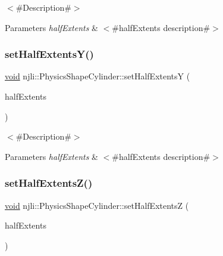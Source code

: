 $<$\#\+Description\#$>$


\begin{DoxyParams}{Parameters}
{\em half\+Extents} & $<$\#half\+Extents description\#$>$ \\
\hline
\end{DoxyParams}
\mbox{\label{classnjli_1_1_physics_shape_cylinder_afac940ffcb588c11962642b4d0329d10}} 
\subsubsection{\texorpdfstring{set\+Half\+Extents\+Y()}{setHalfExtentsY()}}
{\footnotesize\ttfamily \mbox{\hyperlink{_thread_8h_af1e856da2e658414cb2456cb6f7ebc66}{void}} njli\+::\+Physics\+Shape\+Cylinder\+::set\+Half\+ExtentsY (\begin{DoxyParamCaption}\item[{const bt\+Vector3 \&}]{half\+Extents }\end{DoxyParamCaption})}

$<$\#\+Description\#$>$


\begin{DoxyParams}{Parameters}
{\em half\+Extents} & $<$\#half\+Extents description\#$>$ \\
\hline
\end{DoxyParams}
\mbox{\label{classnjli_1_1_physics_shape_cylinder_ab11198a4980fc34eed9c4c4d53bb41e1}} 
\subsubsection{\texorpdfstring{set\+Half\+Extents\+Z()}{setHalfExtentsZ()}}
{\footnotesize\ttfamily \mbox{\hyperlink{_thread_8h_af1e856da2e658414cb2456cb6f7ebc66}{void}} njli\+::\+Physics\+Shape\+Cylinder\+::set\+Half\+ExtentsZ (\begin{DoxyParamCaption}\item[{const bt\+Vector3 \&}]{half\+Extents }\end{DoxyParamCaption})}

